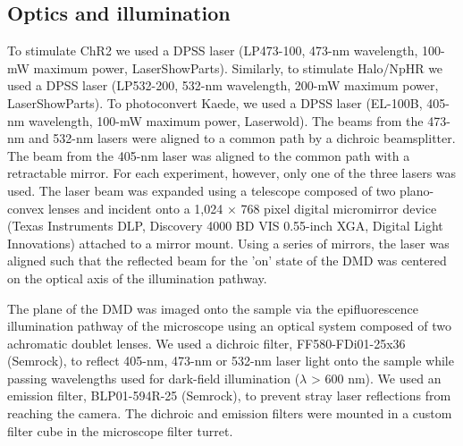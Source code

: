\subsection{Optics and illumination}
To stimulate ChR2 we used a DPSS laser (LP473-100, 473-nm wavelength, 100-mW maximum power, LaserShowParts). Similarly, to stimulate Halo/NpHR we used a DPSS laser (LP532-200, 532-nm wavelength, 200-mW maximum power, LaserShowParts). To photoconvert Kaede, we used a DPSS laser (EL-100B, 405-nm wavelength, 100-mW maximum power, Laserwold). The beams from the 473-nm and 532-nm lasers were aligned to a common path by a dichroic beamsplitter. The beam from the 405-nm laser was aligned to the common path with a retractable mirror. For each experiment, however, only one of the three lasers was used. The laser beam was expanded using a telescope composed of two plano-convex lenses and incident onto a 1,024 × 768 pixel digital micromirror device (Texas Instruments DLP, Discovery 4000 BD VIS 0.55-inch XGA, Digital Light Innovations) attached to a mirror mount. Using a series of mirrors, the laser was aligned such that the reflected beam for the 'on' state of the DMD was centered on the optical axis of the illumination pathway.

The plane of the DMD was imaged onto the sample via the epifluorescence illumination pathway of the microscope using an optical system composed of two achromatic doublet lenses. We used a dichroic filter, FF580-FDi01-25x36 (Semrock), to reflect 405-nm, 473-nm or 532-nm laser light onto the sample while passing wavelengths used for dark-field illumination ($\lambda$ > 600 nm). We used an emission filter, BLP01-594R-25 (Semrock), to prevent stray laser reflections from reaching the camera. The dichroic and emission filters were mounted in a custom filter cube in the microscope filter turret.

